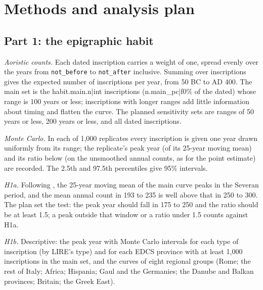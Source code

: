 \section{Methods and analysis plan}\label{sec:design}
\subsection{Part 1: the epigraphic habit}
\textit{Aoristic counts.} Each dated inscription carries a weight of one, spread evenly over the years from \texttt{not\_before} to \texttt{not\_after} inclusive. Summing over inscriptions gives the expected number of inscriptions per year, from 50 BC to AD 400. The main set is the {{habit.main.n|int}} inscriptions ({{n.main_pc|f0}}\% of the dated) whose range is 100 years or less; inscriptions with longer ranges add little information about timing and flatten the curve. The planned sensitivity sets are ranges of 50 years or less, 200 years or less, and all dated inscriptions.

\textit{Monte Carlo.} In each of 1,000 replicates every inscription is given one year drawn uniformly from its range; the replicate's peak year (of its 25-year moving mean) and its ratio below (on the unsmoothed annual counts, as for the point estimate) are recorded. The 2.5th and 97.5th percentiles give 95\% intervals.

\textit{H1a.} Following \citet{macmullen1982}, the 25-year moving mean of the main curve peaks in the Severan period, and the mean annual count in 193 to 235 is well above that in 250 to 300. The plan set the test: the peak year should fall in 175 to 250 and the ratio should be at least 1.5; a peak outside that window or a ratio under 1.5 counts against H1a.

\textit{H1b.} Descriptive: the peak year with Monte Carlo intervals for each type of inscription (by LIRE's type) and for each EDCS province with at least 1,000 inscriptions in the main set, and the curves of eight regional groups (Rome; the rest of Italy; Africa; Hispania; Gaul and the Germanies; the Danube and Balkan provinces; Britain; the Greek East).

